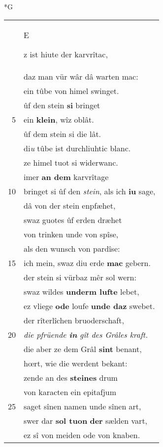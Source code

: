 \documentclass[8pt,a4paper,notitlepage]{article}
\begin{document}
\begin{table}[ht]
\begin{minipage}[t]{0.5\linewidth}
\small
\begin{center}*G
\end{center}
\begin{tabular}{rl}
 & \begin{large}E\end{large}z ist hiute der karvrîtac,\\ 
 & daz man vür wâr dâ warten mac:\\ 
 & ein tûbe von himel swinget.\\ 
 & ûf den stein \textbf{si} bringet\\ 
5 & ein \textbf{klein}, wîz oblât.\\ 
 & ûf dem stein si die lât.\\ 
 & di\textit{u} tûbe ist durchliuhtic blanc.\\ 
 & ze himel tuot si widerwanc.\\ 
 & imer \textbf{an dem} karvrîtage\\ 
10 & bringet si ûf den \textit{stein}, als ich \textbf{iu} sage,\\ 
 & dâ von der stein enpfæhet,\\ 
 & swaz guotes ûf erden dræhet\\ 
 & von trinken unde von spîse,\\ 
 & als den wunsch von pardîse:\\ 
15 & ich mein, swaz diu erde \textbf{mac} gebern.\\ 
 & der stein si vürbaz mêr sol wern:\\ 
 & swaz wildes \textbf{underm lufte} lebet,\\ 
 & ez vliege \textbf{ode} loufe \textbf{unde daz} swebet.\\ 
 & der rîterlîchen bruoderschaft,\\ 
20 & \textit{die pfrüende \textbf{in} gît des Grâles kraft.}\\ 
 & die aber ze dem Grâl \textbf{sint} benant,\\ 
 & hœrt, wie die werdent bekant:\\ 
 & zende an des \textbf{steines} drum\\ 
 & von karacten ein epitafjum\\ 
25 & saget sînen namen unde sînen art,\\ 
 & swer dar \textbf{sol tuon} \textbf{der} sælden vart,\\ 
 & ez sî von meiden ode von knaben.\\ 

\end{tabular}
\end{minipage}
\end{table}
\end{document}
